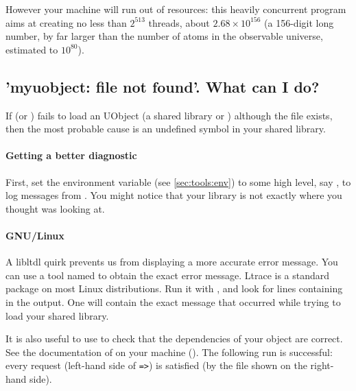 However your machine will run out of resources: this heavily
concurrent program aims at creating no less than $2^{513}$ threads,
about $2.68 \times 10^{156}$ (a 156-digit long number, by far larger
than the number of atoms in the observable universe, estimated to
$10^{80}$).

\subsection{'myuobject: file not found'. What can I do?}
If  (or ) fails to load an UObject (a
shared library or ) although the file exists, then the most
probable cause is an undefined symbol in your shared library.

\paragraph{Getting a better diagnostic}
First, set the  environment variable (see
\autoref{sec:tools:env}) to some high level, say , to log
messages from .  You might notice that your library is
not exactly where you thought  was looking at.

\paragraph{GNU/Linux}
A libltdl quirk prevents us from displaying a more accurate error message.
You can use a tool named  to obtain the exact error message.
Ltrace is a standard package on most Linux distributions.  Run it with
, and look for lines containing
 in the output. One will contain the exact message that
occurred while trying to load your shared library.

It is also useful to use  to check that the dependencies of
your object are correct.  See the documentation of  on your
machine ().  The following run is successful: every request
(left-hand side of \lstinline{=>}) is satisfied (by the file shown on the
right-hand side).


